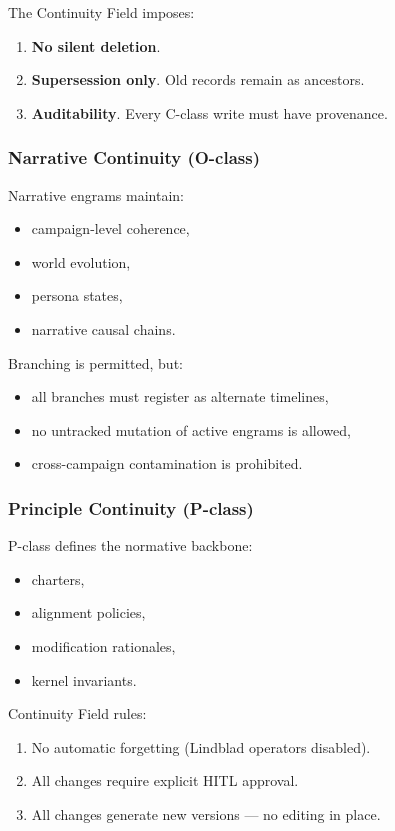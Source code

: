 The Continuity Field imposes:
\begin{enumerate}
    \item \textbf{No silent deletion}.  
    \item \textbf{Supersession only}. Old records remain as ancestors.  
    \item \textbf{Auditability}. Every C-class write must have provenance.
\end{enumerate}

\subsubsection{Narrative Continuity (O-class)}

Narrative engrams maintain:
\begin{itemize}
    \item campaign-level coherence,
    \item world evolution,
    \item persona states,
    \item narrative causal chains.
\end{itemize}

Branching is permitted, but:
\begin{itemize}
    \item all branches must register as alternate timelines,
    \item no untracked mutation of active engrams is allowed,
    \item cross-campaign contamination is prohibited.
\end{itemize}

\subsubsection{Principle Continuity (P-class)}

P-class defines the normative backbone:
\begin{itemize}
    \item charters,
    \item alignment policies,
    \item modification rationales,
    \item kernel invariants.
\end{itemize}

Continuity Field rules:
\begin{enumerate}
    \item No automatic forgetting (Lindblad operators disabled).  
    \item All changes require explicit HITL approval.  
    \item All changes generate new versions --- no editing in place.
\end{enumerate}

